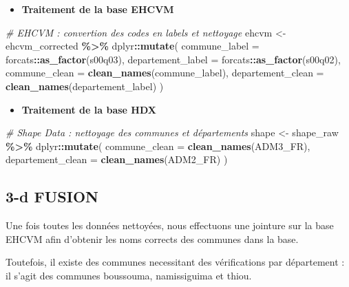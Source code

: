 \documentclass[
]{article}
\newenvironment{Shaded}{\begin{snugshade}}{\end{snugshade}}
\newcommand{\AttributeTok}[1]{\textcolor[rgb]{0.13,0.29,0.53}{#1}}
\newcommand{\CommentTok}[1]{\textcolor[rgb]{0.56,0.35,0.01}{\textit{#1}}}
\newcommand{\FunctionTok}[1]{\textcolor[rgb]{0.13,0.29,0.53}{\textbf{#1}}}
\newcommand{\NormalTok}[1]{#1}
\newcommand{\OtherTok}[1]{\textcolor[rgb]{0.56,0.35,0.01}{#1}}
\newcommand{\SpecialCharTok}[1]{\textcolor[rgb]{0.81,0.36,0.00}{\textbf{#1}}}
\providecommand{\tightlist}{%
  \setlength{\itemsep}{0pt}\setlength{\parskip}{0pt}}
\begin{document}
\begin{itemize}
\tightlist
\item
  \textbf{Traitement de la base EHCVM}
\end{itemize}

\begin{Shaded}
\begin{Highlighting}[]
\CommentTok{\# EHCVM : convertion des codes en labels et nettoyage}
\NormalTok{ehcvm }\OtherTok{\textless{}{-}}\NormalTok{ ehcvm\_corrected }\SpecialCharTok{\%\textgreater{}\%}
\NormalTok{  dplyr}\SpecialCharTok{::}\FunctionTok{mutate}\NormalTok{(}
    \AttributeTok{commune\_label =}\NormalTok{ forcats}\SpecialCharTok{::}\FunctionTok{as\_factor}\NormalTok{(s00q03),}
    \AttributeTok{departement\_label =}\NormalTok{ forcats}\SpecialCharTok{::}\FunctionTok{as\_factor}\NormalTok{(s00q02),}
    \AttributeTok{commune\_clean =} \FunctionTok{clean\_names}\NormalTok{(commune\_label),}
    \AttributeTok{departement\_clean =} \FunctionTok{clean\_names}\NormalTok{(departement\_label)}
\NormalTok{  )}
\end{Highlighting}
\end{Shaded}

\begin{itemize}
\tightlist
\item
  \textbf{Traitement de la base HDX}
\end{itemize}

\begin{Shaded}
\begin{Highlighting}[]
\CommentTok{\# Shape Data : nettoyage des communes et départements}
\NormalTok{shape }\OtherTok{\textless{}{-}}\NormalTok{ shape\_raw }\SpecialCharTok{\%\textgreater{}\%}
\NormalTok{  dplyr}\SpecialCharTok{::}\FunctionTok{mutate}\NormalTok{(}
    \AttributeTok{commune\_clean =} \FunctionTok{clean\_names}\NormalTok{(ADM3\_FR),}
    \AttributeTok{departement\_clean =} \FunctionTok{clean\_names}\NormalTok{(ADM2\_FR)}
\NormalTok{  )}
\end{Highlighting}
\end{Shaded}

\subsection{3-d FUSION}\label{d-fusion}

Une fois toutes les données nettoyées, nous effectuons une jointure sur
la base EHCVM afin d'obtenir les noms corrects des communes dans la
base.

Toutefois, il existe des communes necessitant des vérifications par
département : il s'agit des communes boussouma, namissiguima et thiou.
\end{document}
